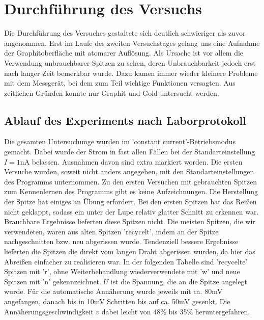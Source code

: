 \section{Durchführung des Versuchs}

Die Durchführung des Versuches gestaltete sich deutlich schwieriger als zuvor angenommen. 
Erst im Laufe des zweiten Versuchstages gelang uns eine Aufnahme der Graphitoberfläche mit 
atomarer Auflösung. Als Ursache ist vor allem die Verwendung unbrauchbarer Spitzen zu sehen, 
deren Unbrauchbarkeit jedoch erst nach langer Zeit bemerkbar wurde. Dazu kamen immer wieder 
kleinere Probleme mit dem Messgerät, bei dem zum Teil wichtige Funktionen versagten. Aus 
zeitlichen Gründen konnte nur Graphit und Gold untersucht werden.  

\subsection{Ablauf des Experiments nach Laborprotokoll}
Die gesamten Untersuchunge wurden im 'constant current'-Betriebsmodus gemacht. Dabei wurde 
der Strom in fast allen Fällen bei der Standarteinstellung $I = 1\mathrm{nA}$ belassen. 
Ausnahmen davon sind extra markiert worden. 
Die ersten Versuche wurden, soweit nicht anders angegeben,  mit den Standarteinstellungen 
des Programms unternommen. Zu den ersten Versuchen mit gebrauchten Spitzen zum Kennenlernen 
des Programms gibt es keine Aufzeichnungen.
Die Herstellung der Spitze hat einiges an Übung erfordert. Bei den ersten Spitzen hat das 
Reißen nicht geklappt, sodass ein unter der Lupe relativ glatter Schnitt zu erkennen war. 
Brauchbare Ergebnisse lieferten diese Spitzen nicht. Die meisten Spitzen, die wir verwendeten, 
waren aus alten Spitzen 'recycelt', indem an der Spitze nachgeschnitten bzw. neu abgerissen 
wurde. Tendenziell bessere Ergebnisse lieferten die Spitzen die direkt vom langen Draht 
abgerissen wurden, da hier das Abreißen einfacher zu realisieren war. In der folgenden Tabelle 
sind 'recycelte' Spitzen mit 'r', ohne Weiterbehandlung wiederverwendete mit 
'w' und neue Spitzen mit 'n' gekennzeichnet. $U$ ist die Spannung, die an die Spitze angelegt 
wurde. Für die automatische Annäherung wurde jeweils mit ca. 80mV angefangen, danach bis 
in 10mV Schritten bis auf ca. 50mV gesenkt. Die Annäherungsgeschwindigkeit $v$ dabei leicht 
von 48\% bis 35\% heruntergefahren. 
\\\\
\newcommand{\EOL}{\\ \hline}
